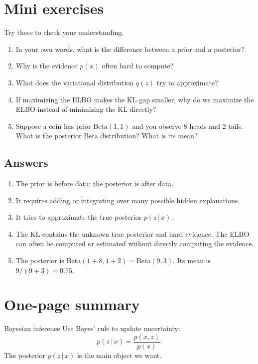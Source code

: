 \documentclass[11pt]{article}
\newcommand{\given}{\,|\,}
\begin{document}
\section{Mini exercises}

Try these to check your understanding.

\begin{enumerate}[leftmargin=*]
  \item In your own words, what is the difference between a prior and a posterior?
  \item Why is the evidence $p(x)$ often hard to compute?
  \item What does the variational distribution $q(z)$ try to approximate?
  \item If maximizing the ELBO makes the KL gap smaller, why do we maximize the ELBO instead of minimizing the KL directly?
  \item Suppose a coin has prior $\mathrm{Beta}(1,1)$ and you observe $8$ heads and $2$ tails. What is the posterior Beta distribution? What is its mean?
\end{enumerate}

\subsection*{Answers}

\begin{enumerate}[leftmargin=*]
  \item The prior is before data; the posterior is after data.
  \item It requires adding or integrating over many possible hidden explanations.
  \item It tries to approximate the true posterior $p(z\given x)$.
  \item The KL contains the unknown true posterior and hard evidence. The ELBO can often be computed or estimated without directly computing the evidence.
  \item The posterior is $\mathrm{Beta}(1+8,1+2)=\mathrm{Beta}(9,3)$. Its mean is $9/(9+3)=0.75$.
\end{enumerate}

\section{One-page summary}

\begin{idea}{Bayesian inference}
Use Bayes' rule to update uncertainty:
\[
p(z\given x)=\frac{p(x,z)}{p(x)}.
\]
The posterior $p(z\given x)$ is the main object we want.
\end{idea}
\end{document}
